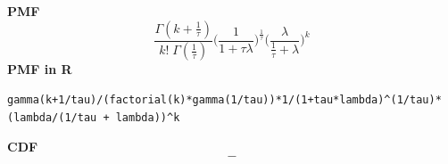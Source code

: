 \smallskip \noindent \hspace{.2cm} \textbf{PMF} 
\begin{equation*}\frac{\Gamma(k + \frac{1}{\tau})}{k!\; \Gamma(\frac{1}{\tau})} \Big(\frac{1}{1+\tau \lambda} \Big)^{\frac{1}{\tau}} 
\Big(\frac{\lambda}{\frac{1}{\tau} + \lambda} \Big)^{k}\end{equation*}
\smallskip \noindent \hspace{.2cm} \textbf{PMF in R}  
\begin{verbatim}gamma(k+1/tau)/(factorial(k)*gamma(1/tau))*1/(1+tau*lambda)^(1/tau)*(lambda/(1/tau + lambda))^k\end{verbatim}
\smallskip \noindent \hspace{.2cm} \textbf{CDF} 
\begin{equation*}-\end{equation*}
%
%
% 
%
%
%
%

